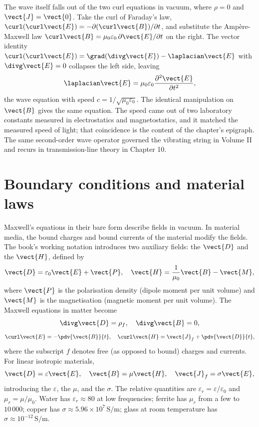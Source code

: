 

\begin{mastery}
The wave itself falls out of the two curl equations in vacuum, where
$\rho = 0$ and $\vect{J} = \vect{0}$. Take the curl of Faraday's law,
$\curl(\curl\vect{E}) = -\partial(\curl\vect{B})/\partial t$, and
substitute the Amp\`ere-Maxwell law $\curl\vect{B} = \mu_0\varepsilon_0\,
\partial\vect{E}/\partial t$ on the right. The vector identity
$\curl(\curl\vect{E}) = \grad(\divg\vect{E}) - \laplacian\vect{E}$ with
$\divg\vect{E} = 0$ collapses the left side, leaving
\[
\laplacian\vect{E} = \mu_0\varepsilon_0\frac{\partial^{2}\vect{E}}{
\partial t^{2}},
\]
the wave equation with speed $c = 1/\sqrt{\mu_0\varepsilon_0}$. The
identical manipulation on $\vect{B}$ gives the same equation. The speed
came out of two laboratory constants measured in electrostatics and
magnetostatics, and it matched the measured speed of light; that
coincidence is the content of the chapter's epigraph. The same
second-order wave operator governed the vibrating string in Volume II
and recurs in transmission-line theory in Chapter 10.
\end{mastery}

\section{Boundary conditions and material laws}

Maxwell's equations in their bare form describe fields in vacuum. In
material media, the bound charges and bound currents of the material
modify the fields. The book's working notation introduces two
auxiliary fields: the  $\vect{D}$ and
the  $\vect{H}$, defined by
\[
\vect{D} = \varepsilon_{0}\vect{E} + \vect{P}, \quad \vect{H} =
\frac{1}{\mu_{0}}\vect{B} - \vect{M},
\]
where $\vect{P}$ is the polarisation density (dipole moment per unit
volume) and $\vect{M}$ is the magnetisation (magnetic moment per unit
volume). The Maxwell equations in matter become
\[
\divg \vect{D} = \rho_{f}, \quad \divg \vect{B} = 0,
\]
\[
\curl \vect{E} = -\pdv{\vect{B}}{t}, \quad \curl \vect{H} = \vect{J}_{f}
+ \pdv{\vect{D}}{t},
\]
where the subscript $f$ denotes free (as opposed to bound) charges and
currents. For linear isotropic materials,
\[
\vect{D} = \varepsilon \vect{E}, \quad \vect{B} = \mu \vect{H},
\quad \vect{J}_{f} = \sigma \vect{E},
\]
introducing the  $\varepsilon$, the
 $\mu$, and the  $\sigma$.
The relative quantities are $\varepsilon_{r} = \varepsilon/\varepsilon
_{0}$ and $\mu_{r} = \mu/\mu_{0}$. Water has $\varepsilon_{r} \approx
80$ at low frequencies; ferrite has $\mu_{r}$ from a few to $10\,000$;
copper has $\sigma \approx 5.96\times 10^{7}\,\si{\siemens\per\meter}$;
glass at room temperature has $\sigma \approx 10^{-12}\,\si{\siemens
\per\meter}$.

